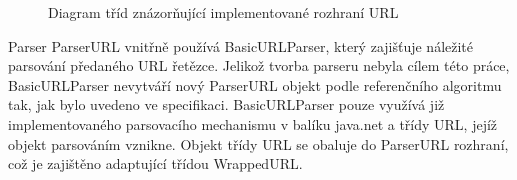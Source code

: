 \begin{figure}[H]
  \begin{center}
    \caption{Diagram tříd znázorňující implementované rozhraní URL}
    \label{Figure.URLInterface}
  \end{center}
\end{figure}

Parser ParserURL vnitřně používá BasicURLParser, který zajišťuje náležité parsování předaného URL řetězce. Jelikož tvorba parseru nebyla cílem této práce, BasicURLParser nevytváří nový ParserURL objekt podle referenčního algoritmu tak, jak bylo uvedeno ve specifikaci. BasicURLParser pouze využívá již implementovaného parsovacího mechanismu v balíku java.net a třídy URL, jejíž objekt parsováním vznikne. Objekt třídy URL se obaluje do ParserURL rozhraní, což je zajištěno adaptující třídou WrappedURL.

